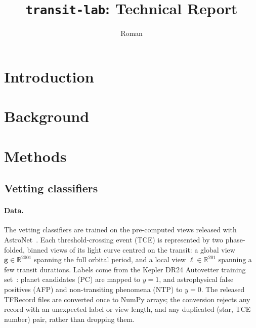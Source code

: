 \documentclass[11pt,a4paper]{article}
\title{\texttt{transit-lab}: Technical Report}
\author{Roman}
\date{}
\begin{document}
\maketitle
\tableofcontents
\newpage

\section{Introduction}
\label{sec:introduction}

\section{Background}
\label{sec:background}

\section{Methods}
\label{sec:methods}
\subsection{Vetting classifiers}
\label{sec:methods-vetting}

\paragraph{Data.}
The vetting classifiers are trained on the pre-computed views released with
AstroNet~\cite{shallue2018,astronet}. Each threshold-crossing event (TCE) is represented by
two phase-folded, binned views of its light curve centred on the transit: a global
view $\mathbf{g} \in \mathbb{R}^{2001}$ spanning the full orbital period, and a local
view $\boldsymbol{\ell} \in \mathbb{R}^{201}$ spanning a few transit durations.
Labels come from the Kepler DR24 Autovetter training set~\cite{mccauliff2015}:
planet candidates (PC) are mapped to $y = 1$, and astrophysical false positives (AFP)
and non-transiting phenomena (NTP) to $y = 0$. The released TFRecord files are
converted once to NumPy arrays; the conversion rejects any record with an unexpected
label or view length, and any duplicated (star, TCE number) pair, rather than dropping them.
\end{document}
